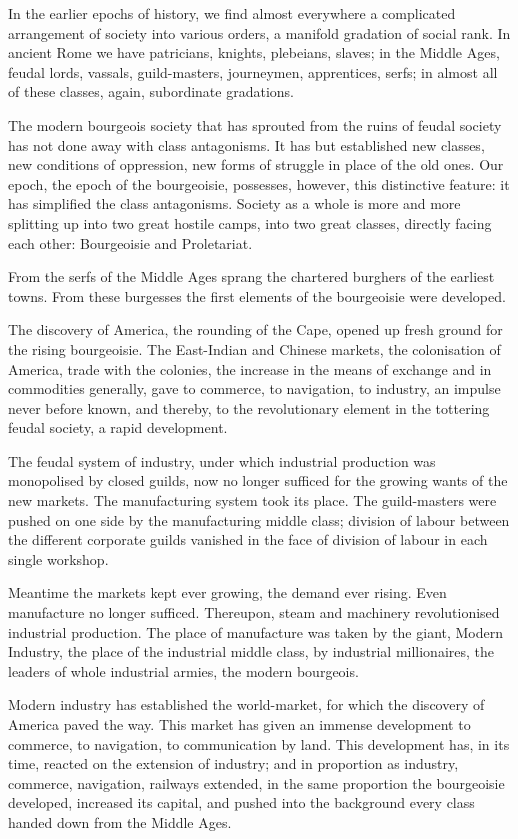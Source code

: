 \documentclass[11pt]{book}
\begin{document}
In the earlier epochs of history, we find almost everywhere a
complicated arrangement of society into various orders, a
manifold gradation of social rank.  In ancient Rome we have
patricians, knights, plebeians, slaves; in the Middle Ages,
feudal lords, vassals, guild-masters, journeymen, apprentices,
serfs; in almost all of these classes, again, subordinate
gradations.

The modern bourgeois society that has sprouted from the ruins
of feudal society has not done away with class antagonisms.  It
has but established new classes, new conditions of oppression,
new forms of struggle in place of the old ones.  Our epoch, the
epoch of the bourgeoisie, possesses, however, this distinctive
feature: it has simplified the class antagonisms. Society as a
whole is more and more splitting up into two great hostile camps,
into two great classes, directly facing each other: Bourgeoisie
and Proletariat.

From the serfs of the Middle Ages sprang the chartered burghers
of the earliest towns.  From these burgesses the first elements
of the bourgeoisie were developed.

The discovery of America, the rounding of the Cape, opened up
fresh ground for the rising bourgeoisie. The East-Indian and
Chinese markets, the colonisation of America, trade with
the colonies, the increase in the means of exchange and in
commodities generally, gave to commerce, to navigation, to
industry, an impulse never before known, and thereby, to the
revolutionary element in the tottering feudal society, a rapid
development.

The feudal system of industry, under which industrial production
was monopolised by closed guilds, now no longer sufficed for the
growing wants of the new markets.  The manufacturing system took
its place.  The guild-masters were pushed on one side by the
manufacturing middle class; division of labour between the
different corporate guilds vanished in the face of division of
labour in each single workshop.

Meantime the markets kept ever growing, the demand ever rising.
Even manufacture no longer sufficed.  Thereupon, steam and
machinery revolutionised industrial production.  The place of
manufacture was taken by the giant, Modern Industry, the place of
the industrial middle class, by industrial millionaires, the
leaders of whole industrial armies, the modern bourgeois.

Modern industry has established the world-market, for which the
discovery of America paved the way.  This market has given an
immense development to commerce, to navigation, to communication
by land.  This development has, in its time, reacted on the
extension of industry; and in proportion as industry, commerce,
navigation, railways extended, in the same proportion the
bourgeoisie developed, increased its capital, and pushed into the
background  every class handed down from the Middle Ages.
\end{document}
